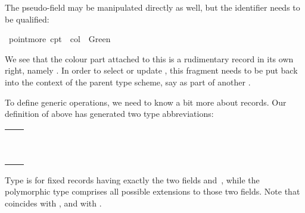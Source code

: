\begin{isabellebody}
\begin{isamarkuptext}
  The  pseudo-field may be manipulated directly as well,
  but the identifier needs to be qualified:%
\end{isamarkuptext}%
\isamarkuptrue%
\ {\isachardoublequote}point{\isachardot}more\ cpt{}\ {\isacharequal}\ {\isasymlparr}col\ {\isacharequal}\ Green{\isasymrparr}{\isachardoublequote}\isanewline
\ \ \isamarkupfalse%
\isamarkupfalse%
%
\begin{isamarkuptext}%
We see that the colour part attached to this  is a
  rudimentary record in its own right, namely .  In order to select or update , this fragment
  needs to be put back into the context of the parent type scheme, say
  as  part of another .

  To define generic operations, we need to know a bit more about
  records.  Our definition of  above has generated two
  type abbreviations:

  \medskip
  \begin{tabular}{l}
  \isa{point}~\isa{{\isacharequal}}~\isa{point} \\
  \isa{{\isacharprime}a\ point{\isacharunderscore}scheme}~\isa{{\isacharequal}}~\isa{{\isacharprime}a\ point{\isacharunderscore}scheme} \\
  \end{tabular}
  \medskip

  Type  is for fixed records having exactly the two fields
   and~, while the polymorphic type  comprises all possible extensions to those two
  fields.  Note that  coincides with , and  with .


\end{isamarkuptext}
\end{isabellebody}
